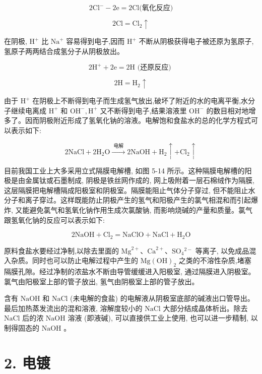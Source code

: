 \documentclass[10pt]{article}
\begin{document}
\[
2{\mathrm{{Cl}}}^{ - } - 2\mathrm{e} = 2\mathrm{{Cl}}\text{(氧化反应)}
\]

\[
2\mathrm{{Cl}} = {\mathrm{{Cl}}}_{2} \uparrow
\]

在阴极, \({\mathrm{H}}^{ + }\) 比 \({\mathrm{{Na}}}^{ + }\) 容易得到电子,因而 \({\mathrm{H}}^{ + }\) 不断从阴极获得电子被还原为氢原子, 氢原子两两结合成氢分子从阴极放出。

\[
2{\mathrm{H}}^{ + } + 2\mathrm{e} = 2\mathrm{H}\text{ (还原反应) }
\]

\[
2\mathrm{H} = {\mathrm{H}}_{2} \uparrow
\]

由于 \({\mathrm{H}}^{ + }\) 在阴极上不断得到电子而生成氢气放出,破坏了附近的水的电离平衡,水分子继续电离成 \({\mathrm{H}}^{ + }\) 和 \({\mathrm{{OH}}}^{ - },{\mathrm{H}}^{ + }\) 又不断得到电子,结果溶液里 \({\mathrm{{OH}}}^{ - }\) 的数目相对地增多了。因而阴极附近形成了氢氧化钠的溶液。电解饱和食盐水的总的化学方程式可以表示如下:

\[
2\mathrm{{NaCl}} + 2{\mathrm{H}}_{2}\mathrm{O}\xrightarrow[]{\text{ 电解 }}2\mathrm{{NaOH}} + {\mathrm{H}}_{2} \uparrow + {\mathrm{{Cl}}}_{2} \uparrow
\]

目前我国工业上大多采用立式隔膜电解槽, 如图 5-14 所示。这种隔膜电解槽的阳极是由金属钛或石墨制成, 阴极是铁丝网作成的, 网上吸附着一层石棉绒作为隔膜, 这层隔膜把电解槽隔成阳极室和阴极室。隔膜能阻止气体分子穿过, 但不能阻止水分子和离子穿过。这样既能防止阴极产生的氢气和阳极产生的氯气相混和而引起爆炸, 又能避免氯气和氢氧化钠作用生成次氯酸钠, 而影响烧碱的产量和质量。氯气跟氢氧化钠的反应可以表示如下:

\[
2\mathrm{{NaOH}} + {\mathrm{{Cl}}}_{2} = \mathrm{{NaClO}} + \mathrm{{NaCl}} + {\mathrm{H}}_{2}\mathrm{O}
\]

原料食盐水要经过净制,以除去里面的 \({\mathrm{{Mg}}}^{2 + }\text{、}{\mathrm{{Ca}}}^{2 + }\text{、}{\mathrm{{SO}}}_{4}{}^{2 - }\) 等离子, 以免成品混入杂质。同时也可以防止电解过程中产生的 \(\mathrm{{Mg}}{\left( \mathrm{{OH}}\right) }_{2}\) 之类的不溶性杂质,堵塞隔膜孔隙。经过净制的浓盐水不断由导管缓缓进入阳极室, 通过隔膜进入阴极室。氯气由阳极室上部的管子放出, 氢气由阴极室上部的管子放出。

含有 \(\mathrm{{NaOH}}\) 和 \(\mathrm{{NaCl}}\) (未电解的食盐) 的电解液从阴极室底部的碱液出口管导出。最后加热蒸发流出的混和溶液, 溶解度较小的 \(\mathrm{{NaCl}}\) 大部分结成晶体析出。除去 \(\mathrm{{NaCl}}\) 后的浓 \(\mathrm{{NaOH}}\) 溶液 (即液碱), 可以直接供工业上使用, 也可以进一步精制, 以制得固态的 \(\mathrm{{NaOH}}\) 。

\section*{2. 电镀}
\end{document}
